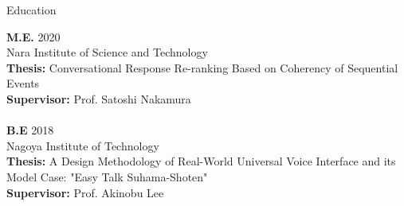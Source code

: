 \documentclass{resume} %
\begin{document}
\begin{rSection}{Education}

{\bf M.E.} \hfill 2020 
\\ Nara Institute of Science and Technology
\\ {\bf Thesis:} Conversational Response Re-ranking Based on Coherency of Sequential Events
\\ {\bf Supervisor:} Prof. Satoshi Nakamura
\\
\\{\bf B.E} \hfill 2018 
\\ Nagoya Institute of Technology
\\ {\bf Thesis:} A Design Methodology of Real-World Universal Voice Interface and its Model Case: "Easy Talk Suhama-Shoten"
\\ {\bf Supervisor:} Prof. Akinobu Lee

\end{rSection}

\end{document}
